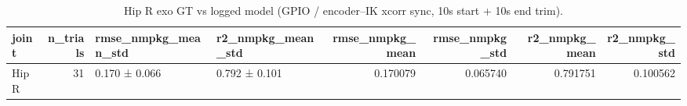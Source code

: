 \begin{table}
\caption{Hip R exo GT vs logged model (GPIO / encoder–IK xcorr sync, 10s start + 10s end trim).}
\label{tab:table1_summary}
\begin{tabular}{lrllrrrr}
\toprule
joint & n\_trials & rmse\_nmpkg\_mean\_std & r2\_nmpkg\_mean\_std & rmse\_nmpkg\_mean & rmse\_nmpkg\_std & r2\_nmpkg\_mean & r2\_nmpkg\_std \\
\midrule
Hip R & 31 & 0.170 ± 0.066 & 0.792 ± 0.101 & 0.170079 & 0.065740 & 0.791751 & 0.100562 \\
\bottomrule
\end{tabular}
\end{table}
